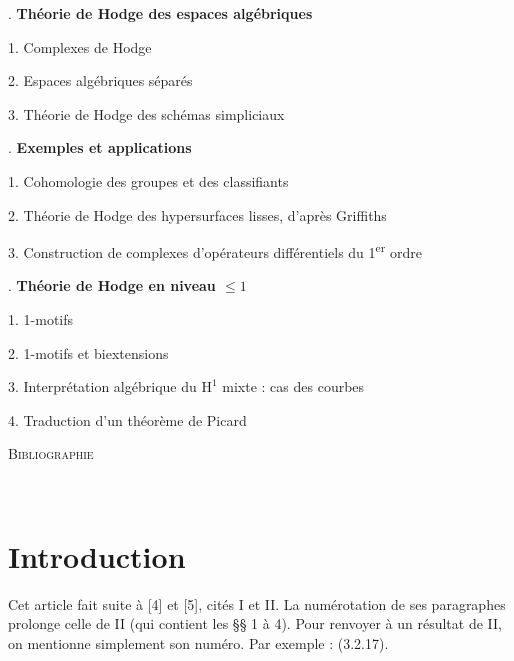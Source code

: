 \documentclass[11pt,leqno]{article}
\newcommand{\Page}[1]{\ifvmode\noindent\else\unskip\ \fi{\footnotesize\textcolor{gray}{[p.\,#1]}}\ \ignorespaces}
\begin{document}
\medskip
{}. \textbf{Théorie de Hodge des espaces algébriques}\par
\noindent\hspace*{1.5em}1. Complexes de Hodge\par
\noindent\hspace*{1.5em}2. Espaces algébriques séparés\par
\noindent\hspace*{1.5em}3. Théorie de Hodge des schémas simpliciaux\par
\medskip
{}. \textbf{Exemples et applications}\par
\noindent\hspace*{1.5em}1. Cohomologie des groupes et des classifiants\par
\noindent\hspace*{1.5em}2. Théorie de Hodge des hypersurfaces lisses, d’après Griffiths\par
\noindent\hspace*{1.5em}3. Construction de complexes d’opérateurs différentiels du 1\textsuperscript{er} ordre\par
\medskip
{}. \textbf{\boldmath Théorie de Hodge en niveau \(\leq 1\)}\par
\noindent\hspace*{1.5em}1. 1-motifs\par
\noindent\hspace*{1.5em}2. 1-motifs et biextensions\par
\noindent\hspace*{1.5em}3. Interprétation algébrique du \(\mathrm{H}^{1}\) mixte : cas des courbes\par
\noindent\hspace*{1.5em}4. Traduction d’un théorème de Picard\par
\medskip
\noindent\textsc{Bibliographie}\par
\endgroup

\Page{6}

\section*{\centering Introduction}

Cet article fait suite à [4] et [5], cités I et II. La numérotation de ses paragraphes prolonge celle de II (qui contient les §§ 1 à 4). Pour renvoyer à un résultat de II, on mentionne simplement son numéro. Par exemple : (3.2.17).
\end{document}
